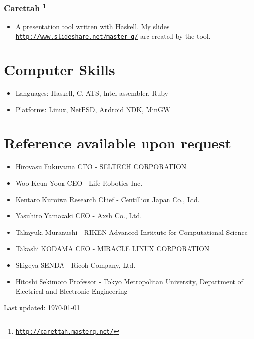 \documentclass[letterpaper]{article}
\def\footer{
  \begin{center}
    \begin{footnotesize}
      Last updated: \today
    \end{footnotesize}
  \end{center}
}
\begin{document}
\subsubsection*{Carettah \footnote{\href{http://carettah.masterq.net/}{\tt http://carettah.masterq.net/}}}
\begin{itemize}
\item A presentation tool written with Haskell. My slides \href{http://www.slideshare.net/master\_q/}{\tt http://www.slideshare.net/master\_q/} are created by the tool.
\end{itemize}

\section*{Computer Skills}

\begin{itemize}
  \item Languages: Haskell, C, ATS, Intel assembler, Ruby
  \item Platforms: Linux, NetBSD, Android NDK, MinGW
\end{itemize}

\section*{Reference available upon request}

\begin{itemize}
  \item Hiroyasu Fukuyama CTO - SELTECH CORPORATION
  \item Woo-Keun Yoon CEO - Life Robotics Inc.
  \item Kentaro Kuroiwa Research Chief - Centillion Japan Co., Ltd.
  \item Yasuhiro Yamazaki CEO - Axsh Co., Ltd.
  \item Takayuki Muranushi - RIKEN Advanced Institute for Computational Science
  \item Takashi KODAMA CEO - MIRACLE LINUX CORPORATION
  \item Shigeya SENDA - Ricoh Company, Ltd.
  \item Hitoshi Sekimoto Professor - Tokyo Metropolitan University, Department of Electrical and Electronic Engineering
\end{itemize}

\bigskip
\footer
\end{document}
